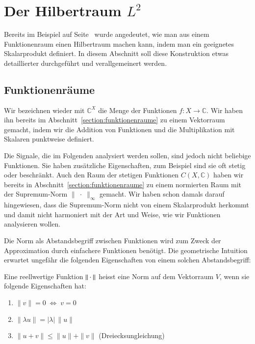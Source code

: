 %
%
%
\section{Der Hilbertraum $L^2$
\label{section:l2}}
Bereits im Beispiel auf Seite~\pageref{geometrie:l2-beispiel} wurde
angedeutet, wie man aus einem Funktionenraum einen Hilbertraum
machen kann, indem man ein geeignetes Skalarprodukt definiert.
In diesem Abschnitt soll diese Konstruktion etwas detaillierter 
durchgeführt und verallgemeinert werden.

\subsection{Funktionenräume}
Wir bezeichnen wieder mit $\mathbb C^X$ die Menge der Funktionen
$f\colon X\to \mathbb C$.
Wir haben ihn bereits im Abschnitt~\ref{section:funktionenraume}
zu einem Vektorraum gemacht, indem wir die
Addition von Funktionen und die Multiplikation mit Skalaren
punktweise definiert.

Die Signale, die im Folgenden analysiert werden sollen, sind jedoch
nicht beliebige Funktionen.
Sie haben zusätzliche Eigenschaften, zum Beispiel sind sie oft stetig
oder beschränkt.
Auch den Raum der stetigen Funktionen $C(X,\mathbb C)$ haben wir bereits
in Abschnitt~\ref{section:funktionenraume} zu einem normierten Raum
mit der Supremum-Norm $\|\;\cdot\;\|_\infty$ gemacht.
Wir haben schon damals darauf hingewiesen, dass die Supremum-Norm
nicht von einem Skalarprodukt herkommt und damit nicht harmoniert
mit der Art und Weise, wie wir Funktionen analysieren wollen.

Die Norm als Abstandsbegriff zwischen Funktionen wird zum Zweck der
Approximation durch einfachere Funktionen benötigt.
Die geometrische Intuition erwartet ungefähr die folgenden Eigenschaften
von einem solchen Abstandsbegriff:

\begin{definition}
Eine reellwertige Funktion $\|\mathstrut\cdot\mathstrut\|$ heisst
eine Norm auf dem Vektorraum $V$, wenn sie folgende Eigenschaften hat:
\begin{enumerate}
\item $\|v\|=0\;\Leftrightarrow\; v = 0$
\item $\| \lambda u \| = |\lambda| \,\|u\|$
\item $\|u + v\| \le \|u\| + \|v\|$ (Dreiecksungleichung)
\end{enumerate}
\end{definition}

